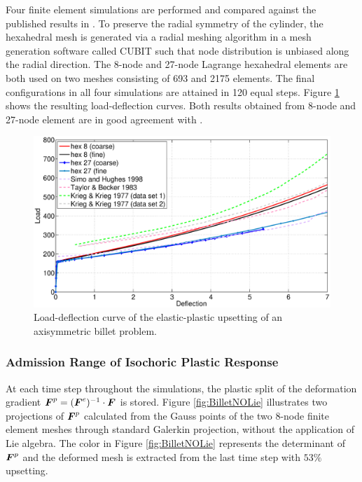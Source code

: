 \documentclass[12pt]{article}
\begin{document}
Four finite element simulations are performed and compared against the
published results in \citep{Krieg.Krieg:1977, Taylor.Becker:1983,
  Simo.Hughes:1998}.  To preserve the radial symmetry of the cylinder,
the hexahedral mesh is generated via a radial meshing algorithm in a
mesh generation software called CUBIT such that node distribution is
unbiased along the radial direction. The 8-node and 27-node Lagrange
hexahedral elements are both used on two meshes consisting of 693 and
2175 elements. The final configurations in all four simulations are
attained in 120 equal steps. Figure \ref{fig:LoadDeflection} shows the
resulting load-deflection curves. Both results obtained from 8-node
and 27-node element are in good agreement with
\citep{Krieg.Krieg:1977, Taylor.Becker:1983, Simo.Hughes:1998}.
\begin{figure}[htbp]
  \begin{center}
    \unitlength=1.0mm
      \includegraphics[width=160mm]{Load_Deflection.eps}
      \caption{Load-deflection curve of the elastic-plastic upsetting
        of an axisymmetric billet problem. }
    \label{fig:LoadDeflection}
  \end{center}
\end{figure}

\subsubsection{Admission Range of Isochoric Plastic Response}
At each time step throughout the simulations, the plastic split of the
deformation gradient ${\boldsymbol{F}}^{p} = ({\boldsymbol{F}}^{e})^{-1} \cdot {\boldsymbol{F}}$ is stored.
Figure \ref{fig:BilletNOLie} illustrates two projections of ${\boldsymbol{F}}^{p}$
calculated from the Gauss points of the two 8-node finite element
meshes through standard Galerkin projection, without the application
of Lie algebra. The color in Figure \ref{fig:BilletNOLie} represents
the determinant of ${\boldsymbol{F}}^{p}$ and the deformed mesh is extracted from
the last time step with $53\%$ upsetting.
\end{document}

